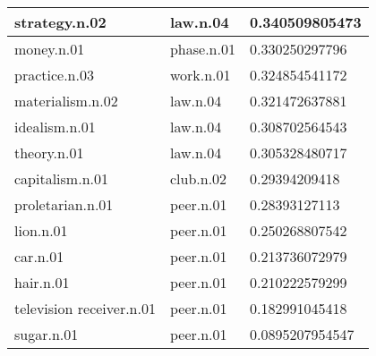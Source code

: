 \begin{center}
\begin{tabular}{ | l | l | l |}
strategy.n.02 & law.n.04 & 0.340509805473 \\ \hline
money.n.01 & phase.n.01 & 0.330250297796 \\ \hline
practice.n.03 & work.n.01 & 0.324854541172 \\ \hline
materialism.n.02 & law.n.04 & 0.321472637881 \\ \hline
idealism.n.01 & law.n.04 & 0.308702564543 \\ \hline
theory.n.01 & law.n.04 & 0.305328480717 \\ \hline
capitalism.n.01 & club.n.02 & 0.29394209418 \\ \hline
proletarian.n.01 & peer.n.01 & 0.28393127113 \\ \hline
lion.n.01 & peer.n.01 & 0.250268807542 \\ \hline
car.n.01 & peer.n.01 & 0.213736072979 \\ \hline
hair.n.01 & peer.n.01 & 0.210222579299 \\ \hline
television receiver.n.01 & peer.n.01 & 0.182991045418 \\ \hline
sugar.n.01 & peer.n.01 & 0.0895207954547 \\ \hline
\end{tabular}
\end{center}